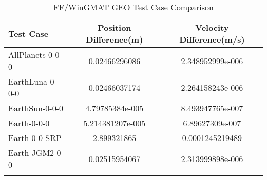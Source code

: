\begin{table}[htbp!]
\centering
\caption{ FF/WinGMAT GEO Test Case Comparison}
      \begin{tabular}{lcc}
      \hline\hline
          Test Case & Position Difference(m) & Velocity Difference(m/s) \\
         \hline
         AllPlanets-0-0-0 & 0.02466296086 & 2.348952999e-006 \\
         EarthLuna-0-0-0 & 0.02466037174 & 2.264158243e-006 \\
         EarthSun-0-0-0 & 4.79785384e-005 & 8.493947765e-007 \\
         Earth-0-0-0 & 5.214381207e-005 & 6.89627309e-007 \\
         Earth-0-0-SRP & 2.899321865 & 0.0001245219489 \\
         Earth-JGM2-0-0 & 0.02515954067 & 2.313999898e-006 \\
      \hline\hline
      \label{Table: GEO FF-WinGMAT Table} 
\end{tabular}
\end{table}
